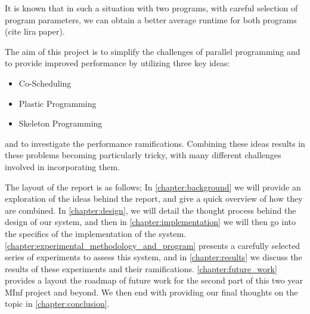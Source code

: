 It is known that in such a situation with two programs, with careful selection of program parameters, we can obtain a better average runtime for both programs (cite lira paper).

The aim of this project is to simplify the challenges of parallel programming and to provide improved performance by utilizing three key ideas:

\begin{itemize}
	\item Co-Scheduling
	\item Plastic Programming
	\item Skeleton Programming
\end{itemize}

and to investigate the performance ramifications. Combining these ideas results in these problems becoming particularly tricky, with many different challenges involved in incorporating them.

The layout of the report is as follows; In \autoref{chapter:background} we will provide an exploration of the ideas behind the report, and give a quick overview of how they are combined. In \autoref{chapter:design}, we will detail the thought process behind the design of our system, and then in \autoref{chapter:implementation} we will then go into the specifics of the implementation of the system. \autoref{chapter:experimental_methodology_and_program} presents a carefully selected series of experiments to assess this system, and in \autoref{chapter:results} we discuss the results of these experiments and their ramifications. \autoref{chapter:future_work} provides a layout the roadmap of future work for the second part of this two year MInf project and beyond. We then end with providing our final thoughts on the topic in \autoref{chapter:conclusion}.